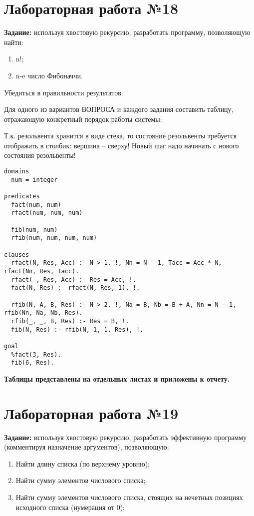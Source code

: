 \chapter{Лабораторная работа №18}

\textbf{Задание:} используя хвостовую рекурсию, разработать программу, позволяющую найти:
\begin{enumerate}
    \item n!;
    \item n-e число Фибоначчи.
\end{enumerate}

Убедиться в правильности результатов.

Для одного из вариантов ВОПРОСА и каждого задания составить таблицу, отражающую конкретный порядок работы системы:

Т.к. резольвента хранится в виде стека, то состояние резольвенты требуется отображать в столбик: вершина – сверху! Новый шаг надо начинать с нового состояния резольвенты!

\begin{lstlisting}
domains
  num = integer

predicates
  fact(num, num)
  rfact(num, num, num)

  fib(num, num)
  rfib(num, num, num, num)

clauses
  rfact(N, Res, Acc) :- N > 1, !, Nn = N - 1, Tacc = Acc * N, rfact(Nn, Res, Tacc).
  rfact(_, Res, Acc) :- Res = Acc, !.
  fact(N, Res) :- rfact(N, Res, 1), !.

  rfib(N, A, B, Res) :- N > 2, !, Na = B, Nb = B + A, Nn = N - 1, rfib(Nn, Na, Nb, Res).
  rfib(_, _, B, Res) :- Res = B, !.
  fib(N, Res) :- rfib(N, 1, 1, Res), !.

goal
  %fact(3, Res).
  fib(6, Res).
\end{lstlisting}

\textbf{Таблицы представлены на отдельных листах и приложены к отчету.}

\chapter{Лабораторная работа №19}

\textbf{Задание:} используя хвостовую рекурсию, разработать эффективную программу (комментируя назначение аргументов), позволяющую:
\begin{enumerate}
    \item Найти длину списка (по верхнему уровню);
    \item Найти сумму элементов числового списка;
    \item Найти сумму элементов числового списка, стоящих на нечетных позициях исходного списка (нумерация от 0);
\end{enumerate}

